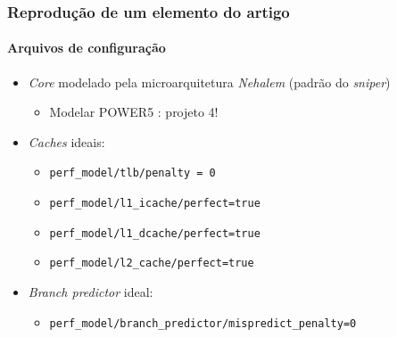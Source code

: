 \documentclass[10pt]{beamer}
\begin{document}
\begin{frame}
\frametitle{Reprodução de um elemento do artigo}
\framesubtitle{Arquivos de configuração}

\begin{itemize}
  
  \item \textit{Core} modelado pela microarquitetura \textit{Nehalem} (padrão do
  \textit{sniper})
  \begin{itemize} 
  \item Modelar POWER5 : projeto 4!
  \end{itemize}
  
  \vspace{12pt}
  \item \textit{Caches} ideais:
 
  \begin{itemize} 
  \item \texttt{perf\_model/tlb/penalty = 0}
  \item \texttt{perf\_model/l1\_icache/perfect=true}
  \item \texttt{perf\_model/l1\_dcache/perfect=true}
  \item \texttt{perf\_model/l2\_cache/perfect=true} 
  \end{itemize}

\vspace{12pt}
\item \textit{Branch predictor} ideal:
  \begin{itemize} 
  \item \texttt{perf\_model/branch\_predictor/mispredict\_penalty=0}
  \end{itemize}
\end{itemize}
\end{frame}
\end{document}
